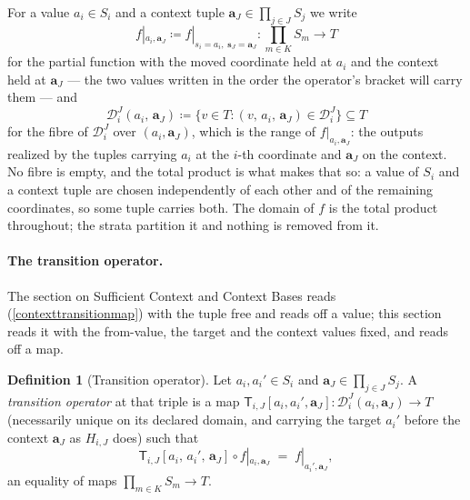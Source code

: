 \documentclass{article}
\theoremstyle{definition}
\newtheorem{definition}[proposition]{Definition}
\theoremstyle{remark}
\begin{document}
\noindent For a value $a_i \in S_i$ and a context tuple $\boldsymbol{a}_J \in \prod_{j \in J} S_j$ we write
\[
f|_{a_i, \boldsymbol{a}_J} \coloneqq f|_{s_i = a_i,\; \boldsymbol{s}_J = \boldsymbol{a}_J} \colon \prod_{m \in K} S_m \to T
\]
for the partial function with the moved coordinate held at $a_i$ and the context held at $\boldsymbol{a}_J$ --- the two values written in the order the operator's bracket will carry them --- and
\[
\mathcal{D}_i^J(a_i,\, \boldsymbol{a}_J) \coloneqq \{v \in T : (v,\, a_i,\, \boldsymbol{a}_J) \in \mathcal{D}_i^J\} \subseteq T
\]
for the fibre of $\mathcal{D}_i^J$ over $(a_i, \boldsymbol{a}_J)$, which is the range of $f|_{a_i, \boldsymbol{a}_J}$: the outputs realized by the tuples carrying $a_i$ at the $i$-th coordinate and $\boldsymbol{a}_J$ on the context. No fibre is empty, and the total product is what makes that so: a value of $S_i$ and a context tuple are chosen independently of each other and of the remaining coordinates, so some tuple carries both. The domain of $f$ is the total product throughout; the strata partition it and nothing is removed from it.

\paragraph{The transition operator.} The section on Sufficient Context and Context Bases reads (\ref{contexttransitionmap}) with the tuple free and reads off a value; this section reads it with the from-value, the target and the context values fixed, and reads off a map.

\begin{definition}[Transition operator]
\label{operatordef}
Let $a_i, a_i' \in S_i$ and $\boldsymbol{a}_J \in \prod_{j \in J} S_j$. A \textit{transition operator} at that triple is a map $\mathsf{T}_{i,J}[a_i, a_i', \boldsymbol{a}_J] \colon \mathcal{D}_i^J(a_i, \boldsymbol{a}_J) \to T$ (necessarily unique on its declared domain, and carrying the target $a_i'$ before the context $\boldsymbol{a}_J$ as $H_{i,J}$ does) such that
\begin{equation}
\label{operatordefining}
\mathsf{T}_{i,J}[a_i,\, a_i',\, \boldsymbol{a}_J] \circ f|_{a_i, \boldsymbol{a}_J} \;=\; f|_{a_i', \boldsymbol{a}_J},
\end{equation}
an equality of maps $\prod_{m \in K} S_m \to T$.
\end{definition}
\end{document}
